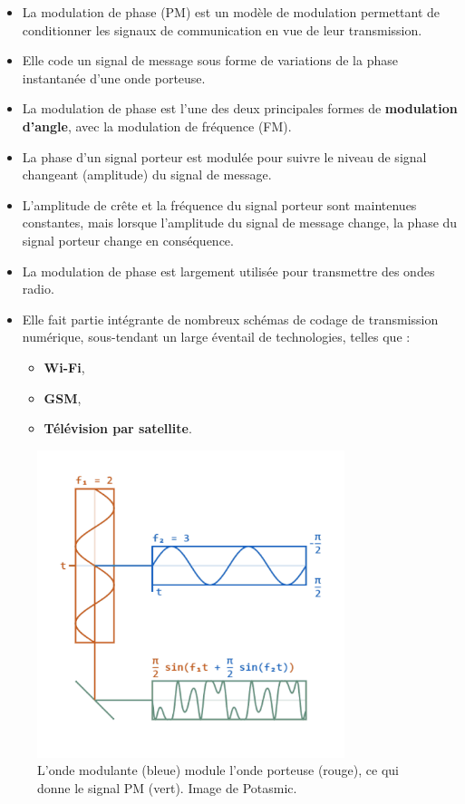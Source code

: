 \begin{itemize}
    \item La modulation de phase (PM) est un modèle de modulation permettant de conditionner les signaux de communication en vue de leur transmission.
    \item Elle code un signal de message sous forme de variations de la phase instantanée d'une onde porteuse.
    \item La modulation de phase est l'une des deux principales formes de \textbf{modulation d'angle}, avec la modulation de fréquence (FM).
    \item La phase d'un signal porteur est modulée pour suivre le niveau de signal changeant (amplitude) du signal de message.
    \item L'amplitude de crête et la fréquence du signal porteur sont maintenues constantes, mais lorsque l'amplitude du signal de message change, la phase du signal porteur change en conséquence.
    \item La modulation de phase est largement utilisée pour transmettre des ondes radio.
    \item Elle fait partie intégrante de nombreux schémas de codage de transmission numérique, sous-tendant un large éventail de technologies, telles que :
    \begin{itemize}
        \item \textbf{Wi-Fi},
        \item \textbf{GSM},
        \item \textbf{Télévision par satellite}.
    \end{itemize}
\end{itemize}
\begin{figure}[H] %
    \centering
    \includegraphics[width=0.8\textwidth]{figures/500px-Phase-modulation.png}
    \caption{L'onde modulante (bleue) module l'onde porteuse (rouge), ce qui donne le signal PM (vert). Image de Potasmic.}
    \label{fig:communication2}
\end{figure}
